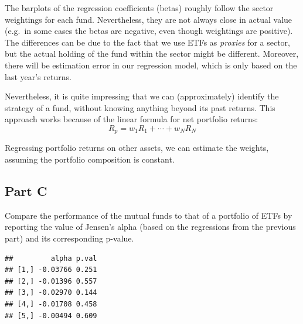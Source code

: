 \documentclass[
  oneside]{book}
\newenvironment{Shaded}{\begin{snugshade}}{\end{snugshade}}
\newcommand{\CommentTok}[1]{\textcolor[rgb]{0.56,0.35,0.01}{\textit{#1}}}
\newcommand{\ControlFlowTok}[1]{\textcolor[rgb]{0.13,0.29,0.53}{\textbf{#1}}}
\newcommand{\DecValTok}[1]{\textcolor[rgb]{0.00,0.00,0.81}{#1}}
\newcommand{\FunctionTok}[1]{\textcolor[rgb]{0.00,0.00,0.00}{#1}}
\newcommand{\NormalTok}[1]{#1}
\newcommand{\OtherTok}[1]{\textcolor[rgb]{0.56,0.35,0.01}{#1}}
\newcommand{\SpecialCharTok}[1]{\textcolor[rgb]{0.00,0.00,0.00}{#1}}
\begin{document}
The barplots of the regression coefficients (betas) roughly follow the sector weightings for each fund. Nevertheless, they are not always close in actual value (e.g.~in some cases the betas are negative, even though weightings are positive). The differences can be due to the fact that we use ETFs as \emph{proxies} for a sector, but the actual holding of the fund within the sector might be different. Moreover, there will be estimation error in our regression model, which is only based on the last year's returns.

Nevertheless, it is quite impressing that we can (approximately) identify the strategy of a fund, without knowing anything beyond its past returns. This approach works because of the linear formula for net portfolio returns:
\[ R_p = w_1 R_1 + \cdots + w_N R_N\]

Regressing portfolio returns on other assets, we can estimate the weights, assuming the portfolio composition is constant.

\hypertarget{part-c-5}{%
\subsection{Part C}\label{part-c-5}}

Compare the performance of the mutual funds to that of a portfolio of ETFs by reporting the value of Jensen's alpha (based on the regressions from the previous part) and its corresponding p-value.

\begin{Shaded}
\end{Shaded}

\begin{verbatim}
##         alpha p.val
## [1,] -0.03766 0.251
## [2,] -0.01396 0.557
## [3,] -0.02970 0.144
## [4,] -0.01708 0.458
## [5,] -0.00494 0.609
\end{verbatim}
\end{document}
